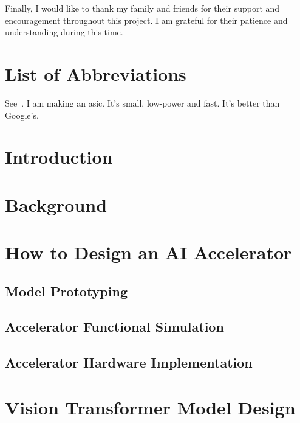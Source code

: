 \documentclass[12pt, hidelinks]{article}
\begin{document}
Finally, I would like to thank my family and friends for their support and encouragement throughout this project. I am grateful for their patience and understanding during this time.

\newpage

\tableofcontents
\newpage

\listoffigures
\newpage

\listoftables
\newpage

\section*{List of Abbreviations}

\newpage

    See~\cite{liu2021edge}.
    I am making an \ac{asic}. It's small, low-power and fast. It's better than Google's.
\section{Introduction}
\lipsum[1]

\newpage
\section{Background}
\lipsum[1]

\newpage
\section{How to Design an AI Accelerator}
\lipsum[1]
\subsection{Model Prototyping}
\lipsum[1]
\subsection{Accelerator Functional Simulation}
\lipsum[1]
\subsection{Accelerator Hardware Implementation}
\lipsum[1]

\newpage
\section{Vision Transformer Model Design}
\label{sec:vision_transformer}
\lipsum[1]
\end{document}
